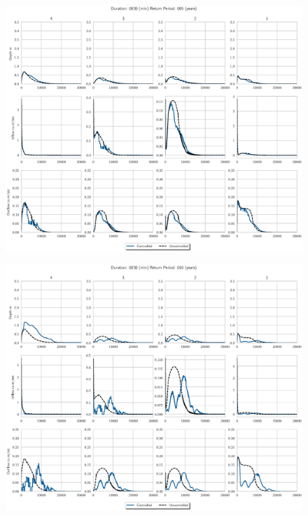 \begin{figure}
    \centering
    \includegraphics[width=\linewidth]{./RL-SI-figures/77storms/0030005.eps}
\end{figure}
\begin{figure}
    \centering
    \includegraphics[width=\linewidth]{./RL-SI-figures/77storms/0030010.eps}
\end{figure}

